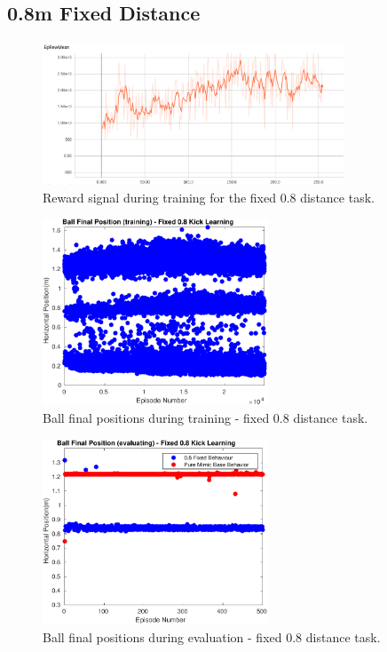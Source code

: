 \subsection{0.8m Fixed Distance}

\begin{figure}[H]
    \centering
    \includegraphics[width=0.8\textwidth]{Chapter7/figures/rew_mean_fix_08.png} 
    \caption{Reward signal during training for the fixed 0.8 distance task.}
    \label{fig:RL_08_kick}
\end{figure}

\begin{figure}[H]
    \centering
    \includegraphics[width=0.6\textwidth]{Chapter7/plots/plot_ball_pos_08fix_kick_train.pdf} 
    \caption{Ball final positions during training - fixed 0.8 distance task.}
    \label{fig:RL_08_kick_pos_train}
\end{figure}

\begin{figure}[H]
    \centering
    \includegraphics[width=0.6\textwidth]{Chapter7/plots/plot_ball_pos_08fix_kick_eval.pdf} 
    \caption{Ball final positions during evaluation - fixed 0.8 distance task.}
    \label{fig:RL_08_kick_pos_eval}
\end{figure}

